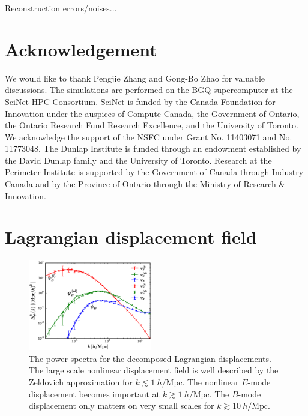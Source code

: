 \documentclass[aps,prd,twocolumn,superscriptaddress,groupedaddress,nofootinbib,amsfont]{revtex4}  %
\newcommand{\mr}{\mathrm}
\begin{document}
Reconstruction errors/noises...



\section{Acknowledgement}
We would like to thank Pengjie Zhang and Gong-Bo Zhao for valuable discussions.
The simulations are performed on the BGQ supercomputer at the SciNet HPC 
Consortium. SciNet is funded by the Canada Foundation for Innovation under 
the auspices of Compute Canada, the Government of Ontario, the Ontario Research 
Fund Research Excellence, and the University of Toronto. We acknowledge the 
support of the NSFC under Grant No. 11403071 and No. 11773048.
The Dunlap Institute is funded through an endowment established by the David Dunlap family and the University of Toronto.
Research at the Perimeter Institute is supported by the Government of Canada
through Industry Canada and by the Province of Ontario through the Ministry of
Research $\&$ Innovation.

\appendix
\section{Lagrangian displacement field}
\label{appendix:A}

\begin{figure}[tbp]
\begin{center}
\includegraphics[width=0.48\textwidth]{f6.eps}
\end{center}
\vspace{-0.7cm}
\caption{The power spectra for the decomposed Lagrangian displacements.
The large scale nonlinear displacement field is well described by the Zeldovich
approximation for $k\lesssim1\ h/\mr{Mpc}$. The nonlinear $E$-mode displacement
becomes important at $k\gtrsim1\ h/\mr{Mpc}$. The $B$-mode displacement only 
matters on very small scales for $k\gtrsim10\ h/\mr{Mpc}$.}
\label{fig:pk_disp}
\end{figure}
\end{document}
